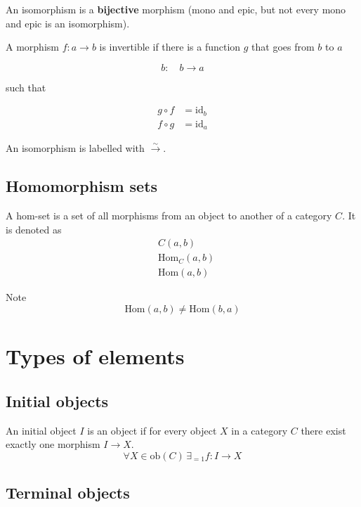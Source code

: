 \documentclass{article}
\begin{document}
An isomorphism is a \textbf{bijective} morphism (mono and epic, but not every mono and epic
is an isomorphism).

A morphism \(f: a \rightarrow b\) is invertible if there
is a function \(g\) that goes from \(b\) to \(a\)

\[
    b:\quad b \rightarrow a
\]

such that

\begin{align*}
    g \circ f &= \text{id}_b
    \\
    f \circ g &= \text{id}_a
\end{align*}

\begin{center}
\end{center}

An isomorphism is labelled with \(\xrightarrow{\sim}\).

\pagebreak

\subsection{Homomorphism sets} %

A hom-set is a set of all morphisms from an object to another
of a category \(C\).
It is denoted as
\begin{align*}
    &C(a, b) \\
    &\text{Hom}_C(a, b) \\
    &\text{Hom}(a, b)
\end{align*}

Note
\[
    \text{Hom}(a, b) \neq \text{Hom}(b, a)
\]

\section{Types of elements}

\subsection{Initial objects}

An initial object \(I\) is an object if
for every object \(X\) in a category \(C\)
there exist exactly one morphism \(I\to X\).
\[
    \forall X\in \text{ob}(C) \,\exists_{=1}f:I\to X
\]

\subsection{Terminal objects}
\end{document}
